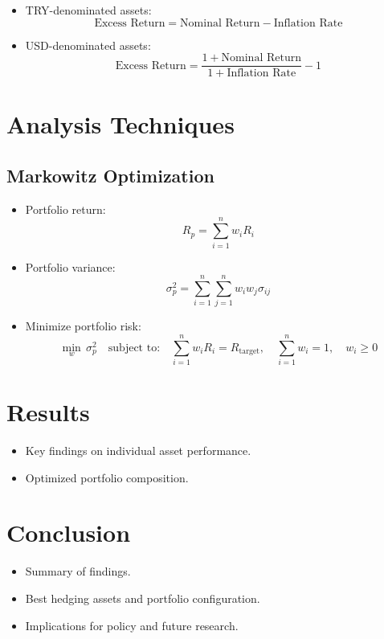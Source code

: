 \documentclass[
  11pt,
]{article}
\providecommand{\tightlist}{%
  \setlength{\itemsep}{0pt}\setlength{\parskip}{0pt}}
\begin{document}
\begin{itemize}
\item
  TRY-denominated assets: \[
  \text{Excess Return} = \text{Nominal Return} - \text{Inflation Rate}
  \]
\item
  USD-denominated assets: \[
  \text{Excess Return} = \frac{1 + \text{Nominal Return}}{1 + \text{Inflation Rate}} - 1
  \]
\end{itemize}

\section{Analysis Techniques}\label{analysis-techniques-1}

\subsection{Markowitz Optimization}\label{markowitz-optimization}

\begin{itemize}
\item
  Portfolio return: \[
  R_p = \sum_{i=1}^{n} w_i R_i
  \]
\item
  Portfolio variance: \[
  \sigma_p^2 = \sum_{i=1}^{n} \sum_{j=1}^{n} w_i w_j \sigma_{ij}
  \]
\item
  Minimize portfolio risk: \[
  \min_{w} \, \sigma_p^2 \quad \text{subject to:} \quad \sum_{i=1}^{n} w_i R_i = R_{\text{target}}, \quad \sum_{i=1}^{n} w_i = 1, \quad w_i \geq 0
  \]
\end{itemize}

\section{Results}\label{results}

\begin{itemize}
\tightlist
\item
  Key findings on individual asset performance.
\item
  Optimized portfolio composition.
\end{itemize}

\section{Conclusion}\label{conclusion}

\begin{itemize}
\tightlist
\item
  Summary of findings.
\item
  Best hedging assets and portfolio configuration.
\item
  Implications for policy and future research.
\end{itemize}
\end{document}
